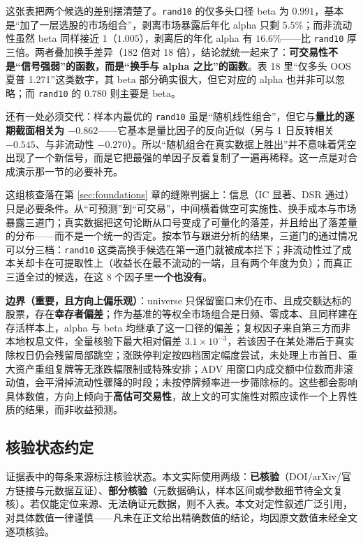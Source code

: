 这张表把两个候选的差别摆清楚了。\texttt{rand10} 的仅多头口径 beta 为 $0.991$，基本是“加了一层选股的市场组合”，剥离市场暴露后年化 alpha 只剩 $5.5\%$；而非流动性虽然 beta 同样接近 1（$1.005$），剥离后的年化 alpha 有 $16.6\%$——比 \texttt{rand10} 厚三倍。两者叠加换手差异（182 倍对 18 倍），结论就统一起来了：\textbf{可交易性不是“信号强弱”的函数，而是“换手与 alpha 之比”的函数}。表 18 里“仅多头 OOS 夏普 1.271”这类数字，其 beta 部分确实很大，但它对应的 alpha 也并非可以忽略；而 \texttt{rand10} 的 $0.780$ 则主要是 beta。

还有一处必须交代：样本内最优的 \texttt{rand10} 虽是“随机线性组合”，但它与\textbf{量比的逐期截面相关为 $-0.862$}——它基本是量比因子的反向近似（另与 1 日反转相关 $-0.545$、与非流动性 $-0.270$）。所以“随机组合在真实数据上胜出”并不意味着凭空出现了一个新信号，而是它把最强的单因子反着复制了一遍再稀释。这一点是对合成演示那一节的必要补充。

这组核查落在第 \ref{sec:foundations} 章的缝隙判据上：信息（IC 显著、DSR 通过）只是必要条件。从“可预测”到“可交易”，中间横着做空可实施性、换手成本与市场暴露三道门；真实数据把这句论断从口号变成了可量化的落差，并且给出了落差量的分布——而不是一个统一的否定。按本节与跟进分析的结果，三道门的通过情况可以分三档：\texttt{rand10} 这类高换手候选在第一道门就被成本拦下；非流动性过了成本关却卡在可提取性上（收益长在最不流动的一端，且有两个年度为负）；而真正三道全过的候选，在这 8 个因子里\textbf{一个也没有}。

\noindent\textbf{边界（重要，且方向上偏乐观）}：universe 只保留窗口末仍在市、且成交额达标的股票，存在\textbf{幸存者偏差}；作为基准的等权全市场组合是日频、零成本、且同样建在存活样本上，alpha 与 beta 均继承了这一口径的偏差；复权因子来自第三方而非本地权息文件，全量核验下最大相对偏差 $3.1\times10^{-3}$，若该因子在某处滞后于真实除权日仍会残留局部跳空；涨跌停判定按四档固定幅度尝试，未处理上市首日、重大资产重组复牌等无涨跌幅限制或特殊安排；ADV 用窗口内成交额中位数而非滚动值，会平滑掉流动性骤降的时段；未按停牌频率进一步筛除标的。这些都会影响具体数值，方向上倾向于\textbf{高估可交易性}，故上文的可实施性对照应读作一个上界性质的结果，而非收益预测。


\subsection{核验状态约定}

证据表中的每条来源标注核验状态。本文实际使用两级：\textbf{已核验}（DOI/arXiv/官方链接与元数据互证）、\textbf{部分核验}（元数据确认，样本区间或参数细节待全文复核）。若仅能定位来源、无法确证元数据，则不入表。本文对定性叙述广泛引用，对具体数值一律谨慎——凡未在正文给出精确数值的结论，均因原文数值未经全文逐项核验。

